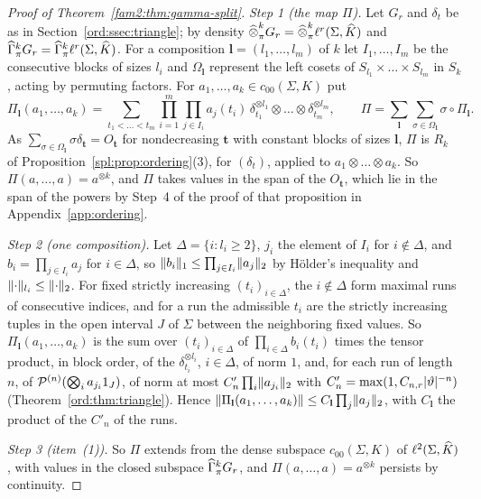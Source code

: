 \begin{proof}[Proof of Theorem~\ref{fam2:thm:gamma-split}]
\emph{Step 1 (the map $\Pi$).} Let $G_r$ and $\delta_t$ be as in Section~\ref{ord:ssec:triangle}; by density
$\mathbin{\widehat\otimes}^k_\pi G_r=\mathbin{\widehat\otimes}^k_\pi\ell^r(\Sigma,\widehat K)$ and $\widehat\Gamma^k_\pi G_r=\widehat\Gamma^k_\pi\ell^r(\Sigma,\widehat K)$. For a composition
$\mathbf l=(l_1,\dots,l_m)$ of $k$ let $I_1,\dots,I_m$ be the consecutive blocks of sizes $l_i$ and $\Omega_{\mathbf l}$
represent the left cosets of $S_{l_1}\times\dots\times S_{l_m}$ in $S_k$, acting by permuting factors. For
$a_1,\dots,a_k\in c_{00}(\Sigma,K)$ put
\[\Pi_{\mathbf l}(a_1,\dots,a_k)=\sum_{t_1<\dots<t_m}\prod_{i=1}^m\prod_{j\in I_i}a_j(t_i)\,\delta_{t_1}^{\otimes l_1}
\otimes\dots\otimes\delta_{t_m}^{\otimes l_m},\qquad\Pi=\sum_{\mathbf l}\sum_{\sigma\in\Omega_{\mathbf l}}\sigma\circ
\Pi_{\mathbf l}.\]
As $\sum_{\sigma\in\Omega_{\mathbf l}}\sigma\delta_{\mathbf t}=O_{\mathbf t}$ for nondecreasing $\mathbf t$ with constant
blocks of sizes $\mathbf l$, $\Pi$ is $R_k$ of Proposition~\ref{spl:prop:ordering}(3), for $(\delta_t)$, applied to
$a_1\otimes\dots\otimes a_k$. So $\Pi(a,\dots,a)=a^{\otimes k}$, and $\Pi$ takes values in the span of the $O_{\mathbf t}$,
which lie in the span of the powers by Step~4 of the proof of that proposition in Appendix~\ref{app:ordering}.

\emph{Step 2 (one composition).} Let $\Delta=\{i:l_i\ge2\}$, $j_i$ the element of $I_i$ for $i\notin\Delta$, and
$b_i=\prod_{j\in I_i}a_j$ for $i\in\Delta$, so $\lVert b_i\rVert_1\le\prod_{j\in I_i}\lVert a_j\rVert_2$ by H\"older's inequality and
$\lVert \cdot\rVert_{l_i}\le\lVert \cdot\rVert_2$. For fixed strictly increasing $(t_i)_{i\in\Delta}$, the $i\notin\Delta$ form maximal runs
of consecutive indices, and for a run the admissible $t_i$ are the strictly increasing tuples in the open interval $J$ of
$\Sigma$ between the neighboring fixed values. So $\Pi_{\mathbf l}(a_1,\dots,a_k)$ is the sum over $(t_i)_{i\in\Delta}$ of
$\prod_{i\in\Delta}b_i(t_i)$ times the tensor product, in block order, of the $\delta_{t_i}^{\otimes l_i}$, $i\in\Delta$, of
norm $1$, and, for each run of length $n$, of $\mathcal P^{(n)}(\bigotimes_i
a_{j_i}1_J)$, of norm at most $C'_n\prod_i\lVert a_{j_i}\rVert_2$ with $C'_n=\max(1,C_{n,r}\lvert \vartheta\rvert^{-n})$
(Theorem~\ref{ord:thm:triangle}). Hence $\lVert \Pi_{\mathbf l}(a_1,\dots,a_k)\rVert\le C_{\mathbf l}\prod_j\lVert a_j\rVert_2$, with
$C_{\mathbf l}$ the product of the $C'_n$ of the runs.

\emph{Step 3 (item~(1)).} So $\Pi$ extends from the dense subspace $c_{00}(\Sigma,K)$ of $\ell^2(\Sigma,\widehat K)$, with values
in the closed subspace $\widehat\Gamma^k_\pi G_r$, and $\Pi(a,\dots,a)=a^{\otimes k}$ persists by continuity.


\end{proof}
